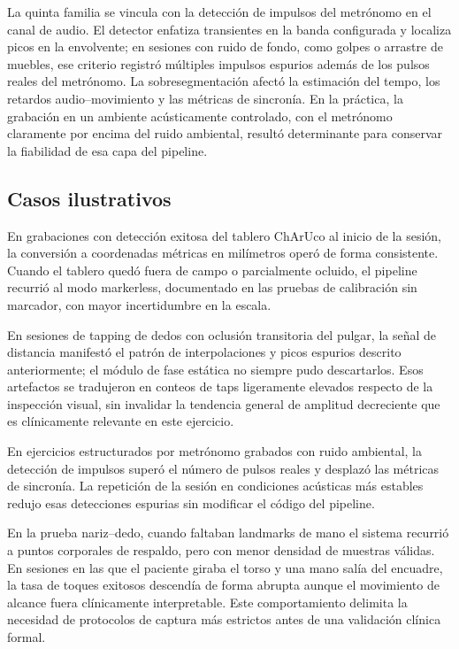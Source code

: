 La quinta familia se vincula con la detección de impulsos del metrónomo en el canal de audio. El detector enfatiza transientes en la banda configurada y localiza picos en la envolvente; en sesiones con ruido de fondo, como golpes o arrastre de muebles, ese criterio registró múltiples impulsos espurios además de los pulsos reales del metrónomo. La sobresegmentación afectó la estimación del tempo, los retardos audio--movimiento y las métricas de sincronía. En la práctica, la grabación en un ambiente acústicamente controlado, con el metrónomo claramente por encima del ruido ambiental, resultó determinante para conservar la fiabilidad de esa capa del pipeline.

\subsection{Casos ilustrativos}

En grabaciones con detección exitosa del tablero ChArUco al inicio de la sesión, la conversión a coordenadas métricas en milímetros operó de forma consistente. Cuando el tablero quedó fuera de campo o parcialmente ocluido, el pipeline recurrió al modo markerless, documentado en las pruebas de calibración sin marcador, con mayor incertidumbre en la escala.

En sesiones de tapping de dedos con oclusión transitoria del pulgar, la señal de distancia manifestó el patrón de interpolaciones y picos espurios descrito anteriormente; el módulo de fase estática no siempre pudo descartarlos. Esos artefactos se tradujeron en conteos de taps ligeramente elevados respecto de la inspección visual, sin invalidar la tendencia general de amplitud decreciente que es clínicamente relevante en este ejercicio.

En ejercicios estructurados por metrónomo grabados con ruido ambiental, la detección de impulsos superó el número de pulsos reales y desplazó las métricas de sincronía. La repetición de la sesión en condiciones acústicas más estables redujo esas detecciones espurias sin modificar el código del pipeline.

En la prueba nariz--dedo, cuando faltaban landmarks de mano el sistema recurrió a puntos corporales de respaldo, pero con menor densidad de muestras válidas. En sesiones en las que el paciente giraba el torso y una mano salía del encuadre, la tasa de toques exitosos descendía de forma abrupta aunque el movimiento de alcance fuera clínicamente interpretable. Este comportamiento delimita la necesidad de protocolos de captura más estrictos antes de una validación clínica formal.

